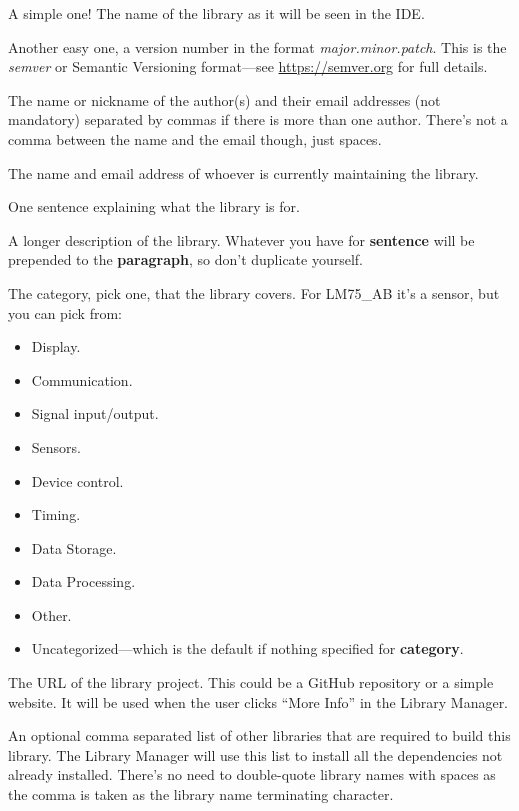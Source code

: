\begin{description}
    \item[\textbf{name}] A simple one! The name of the library as it will be seen in the IDE.
    \item[\textbf{version}] Another easy one, a version number in the format \emph{major.minor.patch}. This is the \emph{semver} or Semantic Versioning format---see \url{https://semver.org} for full details.
    \item[\textbf{author}] The name or nickname of the author(s) and their email addresses (not mandatory) separated by commas if there is more than one author. There's not a comma between the name and the email though, just spaces.
    \item[\textbf{maintainer}] The name and email address of whoever is currently maintaining the library.
    \item[\textbf{sentence}] One sentence explaining what the library is for.
    \item[\textbf{paragraph}] A longer description of the library. Whatever you have for \textbf{sentence} will be prepended to the \textbf{paragraph}, so don't duplicate yourself.
    \item[\textbf{category}] The category, pick one, that the library covers. For LM75\_AB it's a sensor, but you can pick from:
    \begin{itemize}
        \item Display.
        \item Communication.
        \item Signal input/output.
        \item Sensors.
        \item Device control.
        \item Timing.
        \item Data Storage.
        \item Data Processing.
        \item Other.
        \item Uncategorized---which is the default if nothing specified for \textbf{category}.
    \end{itemize}
    \item[\textbf{url}] The URL of the library project. This could be a GitHub repository or a simple website. It will be used when the user clicks ``More Info'' in the Library Manager.
    \item[\textbf{depends}] An optional comma separated list of other libraries that are required to build this library. The Library Manager will use this list to install all the dependencies not already  installed. There's no need to double-quote library names with spaces as the comma is taken as the library name terminating character.

\end{description}
